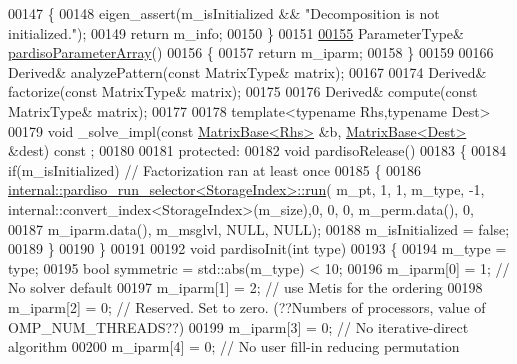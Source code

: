 \begin{DoxyCode}
00147 \textcolor{keyword}{    }\{
00148       eigen\_assert(m\_isInitialized && \textcolor{stringliteral}{"Decomposition is not initialized."});
00149       \textcolor{keywordflow}{return} m\_info;
00150     \}
00151 
\hyperlink{class_eigen_1_1_pardiso_impl_a42a7983796076edc52e0e8d2869610ec}{00155}     ParameterType& \hyperlink{class_eigen_1_1_pardiso_impl_a42a7983796076edc52e0e8d2869610ec}{pardisoParameterArray}()
00156     \{
00157       \textcolor{keywordflow}{return} m\_iparm;
00158     \}
00159     
00166     Derived& analyzePattern(\textcolor{keyword}{const} MatrixType& matrix);
00167     
00174     Derived& factorize(\textcolor{keyword}{const} MatrixType& matrix);
00175 
00176     Derived& compute(\textcolor{keyword}{const} MatrixType& matrix);
00177 
00178     \textcolor{keyword}{template}<\textcolor{keyword}{typename} Rhs,\textcolor{keyword}{typename} Dest>
00179     \textcolor{keywordtype}{void} \_solve\_impl(\textcolor{keyword}{const} \hyperlink{group___core___module_class_eigen_1_1_matrix_base}{MatrixBase<Rhs>} &b, \hyperlink{group___core___module_class_eigen_1_1_matrix_base}{MatrixBase<Dest>} &dest) \textcolor{keyword}{const}
      ;
00180 
00181   \textcolor{keyword}{protected}:
00182     \textcolor{keywordtype}{void} pardisoRelease()
00183     \{
00184       \textcolor{keywordflow}{if}(m\_isInitialized) \textcolor{comment}{// Factorization ran at least once}
00185       \{
00186         \hyperlink{struct_eigen_1_1internal_1_1pardiso__run__selector}{internal::pardiso\_run\_selector<StorageIndex>::run}(
      m\_pt, 1, 1, m\_type, -1, internal::convert\_index<StorageIndex>(m\_size),0, 0, 0, m\_perm.data(), 0,
00187                                                           m\_iparm.data(), m\_msglvl, NULL, NULL);
00188         m\_isInitialized = \textcolor{keyword}{false};
00189       \}
00190     \}
00191 
00192     \textcolor{keywordtype}{void} pardisoInit(\textcolor{keywordtype}{int} type)
00193     \{
00194       m\_type = type;
00195       \textcolor{keywordtype}{bool} symmetric = std::abs(m\_type) < 10;
00196       m\_iparm[0] = 1;   \textcolor{comment}{// No solver default}
00197       m\_iparm[1] = 2;   \textcolor{comment}{// use Metis for the ordering}
00198       m\_iparm[2] = 0;   \textcolor{comment}{// Reserved. Set to zero. (??Numbers of processors, value of OMP\_NUM\_THREADS??)}
00199       m\_iparm[3] = 0;   \textcolor{comment}{// No iterative-direct algorithm}
00200       m\_iparm[4] = 0;   \textcolor{comment}{// No user fill-in reducing permutation}

\end{DoxyCode}
